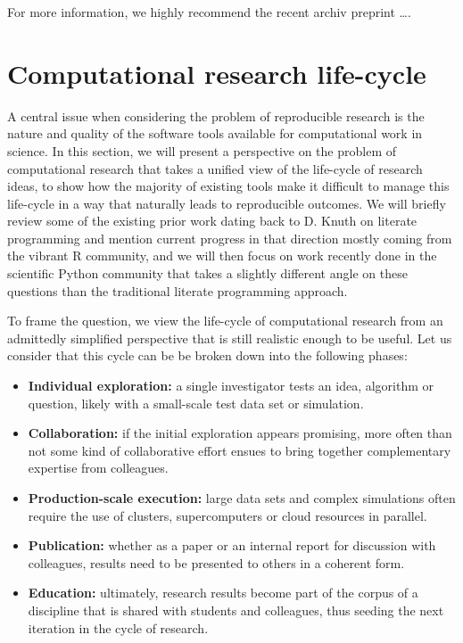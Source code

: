 \documentclass[ChapterTOCs,krantz2]{krantz} %
\begin{document}
For more information, we highly recommend the recent archiv preprint
\ldots \cite{2012arXiv1210.0530A}.

\section{\label{sec:life-cycle}Computational research life-cycle}

A central issue when considering the problem of reproducible research is the
nature and quality of the software tools available for computational work in
science.  In this section, we will present a perspective on the problem of
computational research that takes a unified view of the life-cycle of research
ideas, to show how the majority of existing tools make it difficult to manage
this life-cycle in a way that naturally leads to reproducible outcomes.  We
will briefly review some of the existing prior work dating back to D. Knuth on
literate programming \cite{Knuth92} and mention current progress in that
direction mostly coming from the vibrant R community, and we will then focus on
work recently done in the scientific Python community that takes a slightly
different angle on these questions than the traditional literate programming
approach.

To frame the question, we view the life-cycle of computational research from an
admittedly simplified perspective that is still realistic enough to be
useful. Let us consider that this cycle can be be broken down into the
following phases:

\begin{itemize}
\item \textbf{Individual exploration:} a single investigator tests an idea,
  algorithm or question, likely with a small-scale test data set or simulation.
\item \textbf{Collaboration:} if the initial exploration appears promising,
  more often than not some kind of collaborative effort ensues to bring
  together complementary expertise from colleagues.
\item \textbf{Production-scale execution:} large data sets and complex
  simulations often require the use of clusters, supercomputers or cloud
  resources in parallel.
\item \textbf{Publication:} whether as a paper or an internal report for
  discussion with colleagues, results need to be presented to others in a
  coherent form.
\item \textbf{Education:} ultimately, research results become part of the
  corpus of a discipline that is shared with students and colleagues, thus
  seeding the next iteration in the cycle of research.
\end{itemize}
\end{document}
